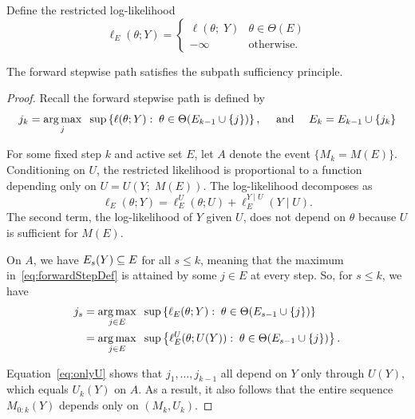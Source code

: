 \documentclass{article}
\begin{document}
Define the restricted log-likelihood
\begin{equation}
\ell_E(\theta; Y) = \left\{\begin{matrix} 
    \ell(\theta; \;Y) & \theta \in \Theta(E)\\ 
    -\infty  & \mathrm{ otherwise.}\end{matrix}\right. 
\end{equation}

\begin{proposition}\label{prop:forwardSSP}
  The forward stepwise path satisfies the subpath sufficiency principle.
\end{proposition}
\begin{proof}
  Recall the forward stepwise path is defined by
  \begin{equation}\label{eq:forwardStepDef}
    j_k = \operatorname*{arg\,max}_j \;\;\sup \left\{\ell(\theta; Y):\; \theta\in\Theta(E_{k-1} \cup \{j\})\right\}, \quad \text{ and } \quad
    E_k = E_{k-1} \cup \{j_k\}
  \end{equation}
  
  For some fixed step $k$ and active set $E$, let $A$ denote the event $\{M_k = M(E)\}$. Conditioning on $U$, the restricted likelihood is proportional to a function depending only on $U = U(Y; \;M(E))$. The log-likelihood decomposes as
  \[
  \ell_E(\theta; Y) = \ell_E^{U}(\theta; U) 
  + \ell_E^{Y \mid U}(Y \mid U).
  \]
  The second term, the log-likelihood of $Y$ given $U$, does not depend on $\theta$ because $U$ is sufficient for $M(E)$.

  On $A$, we have $E_s(Y) \subseteq E$ for all $s\leq k$, meaning that the maximum in~\eqref{eq:forwardStepDef} is attained by some $j\in E$ at every step. So, for $s \leq k$, we have
\begin{align}
  j_s &= \operatorname*{arg\,max}_{j\in E} \;\;\sup \left\{\ell_E(\theta; Y):\;
    \theta\in\Theta(E_{s-1} \cup \{j\})\right\} \\
  &= \operatorname*{arg\,max}_{j\in E} \;\;\sup \left\{\ell_E^U(\theta; U(Y)):\;
    \theta\in\Theta(E_{s-1} \cup \{j\})\right\}. \label{eq:onlyU}
\end{align}

Equation~\eqref{eq:onlyU} shows that $j_1,\ldots, j_{k-1}$ all depend on $Y$ only through $U(Y)$, which equals $U_k(Y)$ on $A$. As a result, it also follows that the entire sequence $M_{0:k}(Y)$ depends only on $(M_k, U_k)$.
\end{proof}

\end{document}
